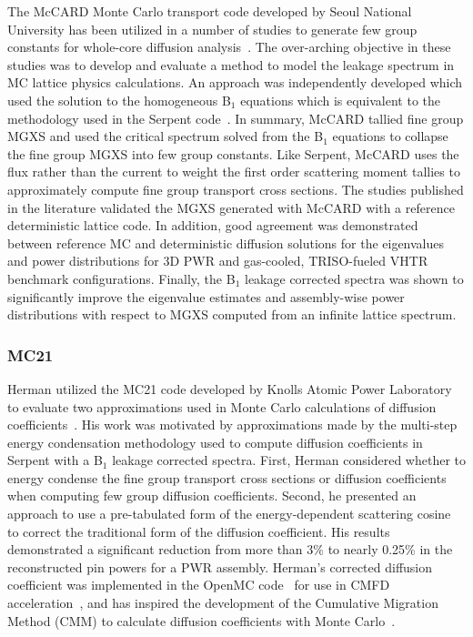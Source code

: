The McCARD Monte Carlo transport code developed by Seoul National University has been utilized in a number of studies to generate few group constants for whole-core diffusion analysis~\cite{shim2008generation, park2010assembly, park2012generation}. The over-arching objective in these studies was to develop and evaluate a method to model the leakage spectrum in \ac{MC} lattice physics calculations. An approach was independently developed which used the solution to the homogeneous B$_{1}$ equations which is equivalent to the methodology used in the Serpent code~\cite{fridman2011serpent}. In summary, McCARD tallied fine group \ac{MGXS} and used the critical spectrum solved from the B$_{1}$ equations to collapse the fine group \ac{MGXS} into few group constants. Like Serpent, McCARD uses the flux rather than the current to weight the first order scattering moment tallies to approximately compute fine group transport cross sections. The studies published in the literature validated the \ac{MGXS} generated with McCARD with a reference deterministic lattice code. In addition, good agreement was demonstrated between reference \ac{MC} and deterministic diffusion solutions for the eigenvalues and power distributions for 3D \ac{PWR} and gas-cooled, TRISO-fueled \ac{VHTR} benchmark configurations. Finally, the B$_{1}$ leakage corrected spectra was shown to significantly improve the eigenvalue estimates and assembly-wise power distributions with respect to \ac{MGXS} computed from an infinite lattice spectrum.

\subsubsection{MC21}
\label{subsec:chap3-lit-review-diffusion-mc21}

Herman utilized the MC21 code developed by Knolls Atomic Power Laboratory to evaluate two approximations used in Monte Carlo calculations of diffusion coefficients~\cite{herman2013improved}. His work was motivated by approximations made by the multi-step energy condensation methodology used to compute diffusion coefficients in Serpent with a B$_{1}$ leakage corrected spectra. First, Herman considered whether to energy condense the fine group transport cross sections or diffusion coefficients when computing few group diffusion coefficients. Second, he presented an approach to use a pre-tabulated form of the energy-dependent scattering cosine to correct the traditional form of the diffusion coefficient. His results demonstrated a significant reduction from more than 3\% to nearly 0.25\% in the reconstructed pin powers for a \ac{PWR} assembly. Herman's corrected diffusion coefficient was implemented in the OpenMC code~\cite{romano2013openmc} for use in \ac{CMFD} acceleration~\cite{herman2014monte}, and has inspired the development of the Cumulative Migration Method (CMM) to calculate diffusion coefficients with Monte Carlo~\cite{liuphysor2016}.

